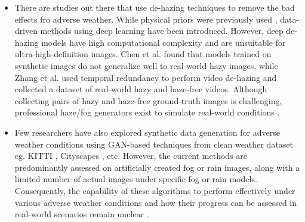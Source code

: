 \documentclass[rnd]{mas_proposal}
\begin{document}
\begin{itemize}
      
      \item There are studies out there that use de-hazing techniques to remove the bad effects fro adverse weather. While physical priors were previously used \cite{tan2008visibility} \cite{tarel2009fast}, data-driven methods using deep learning have been introduced. However, deep de-hazing models have high computational complexity and are unsuitable for ultra-high-definition images. Chen et al. \cite{chen2021psd} found that models trained on synthetic images do not generalize well to real-world hazy images, while Zhang et al. \cite{zhang2021learning} used temporal redundancy to perform video de-hazing and collected a dataset of real-world hazy and haze-free videos. Although collecting pairs of hazy and haze-free ground-truth images is challenging, professional haze/fog generators exist to simulate real-world conditions \cite{musat2021multi} \cite{timofte2018ntire}.

      \item Few researchers \cite{sun2021multi} \cite{zheng2020forkgan} \cite{lee2022perception} have also explored synthetic data generation for adverse weather conditions using GAN-based techniques from clean weather dataset eg. KITTI \cite{geiger2012we}, Cityscapes \cite{cordts2016cityscapes}, etc. However, the current methods are predominantly assessed on artificially created fog or rain images, along with a limited number of actual images under specific fog or rain models. Consequently, the capability of these algorithms to perform effectively under various adverse weather conditions and how their progress can be assessed in real-world scenarios remain unclear \cite{hassaballah2020vehicle}.
      

\end{itemize}
\end{document}

